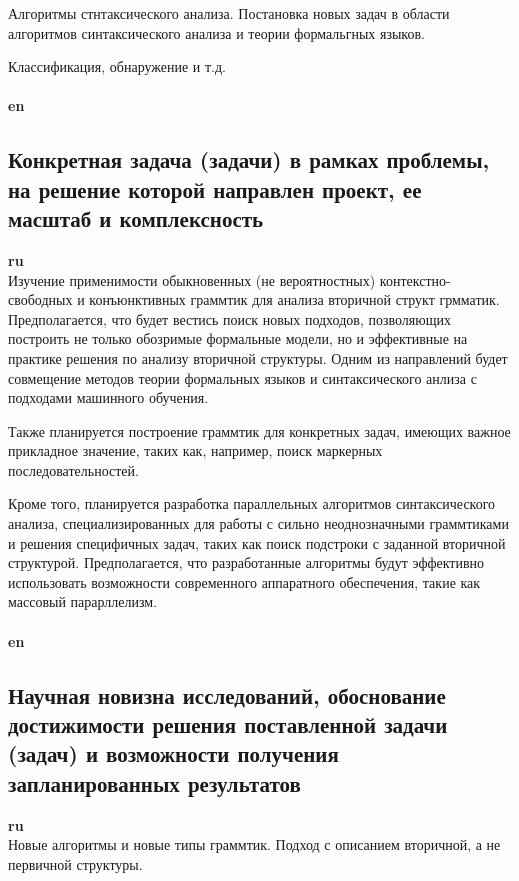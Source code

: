 \documentclass[12pt]{article}  %
\theoremstyle{remark}
\begin{document}
Алгоритмы стнтаксического анализа.
Постановка новых задач в области алгоритмов синтаксического анализа и теории формальгных языков.

Классификация, обнаружение и т.д.
\\
\\
\textbf{en}\\



\subsection{Конкретная задача (задачи) в рамках проблемы, на решение которой направлен проект, ее масштаб и комплексность}

\textbf{ru}\\
Изучение применимости обыкновенных (не вероятностных) контекстно-свободных и конъюнктивных граммтик для анализа вторичной структ грмматик.
Предполагается, что будет вестись поиск новых подходов, позволяющих построить не только обозримые формальные модели, но и эффективные на практике решения по анализу вторичной структуры.
Одним из направлений будет совмещение методов теории формальных языков и синтаксического анлиза с подходами машинного обучения.

Также планируется построение граммтик для конкретных задач, имеющих важное прикладное значение, таких как, например, поиск маркерных последовательностей.

Кроме того, планируется разработка параллельных алгоритмов синтаксического анализа, специализированных для работы с сильно неоднозначными граммтиками и решения специфичных задач, таких как поиск подстроки с заданной вторичной структурой.
Предполагается, что разработанные алгоритмы будут эффективно использовать возможности современного аппаратного обеспечения, такие как массовый парарллелизм.
\\
\\
\textbf{en}\\


\subsection{Научная новизна исследований, обоснование достижимости решения поставленной задачи (задач) и возможности получения запланированных результатов}

\textbf{ru}\\
Новые алгоритмы и новые типы граммтик.
Подход с описанием вторичной, а не первичной структуры.
\end{document}
